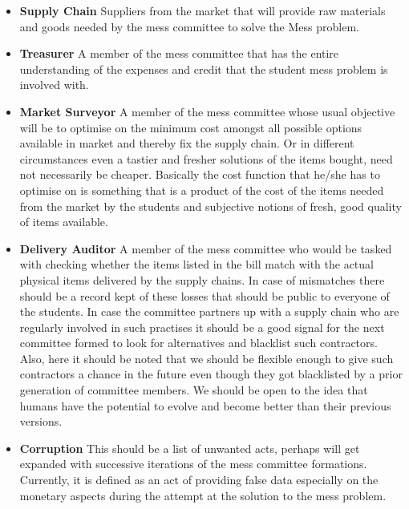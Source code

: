 \documentclass[12pt]{report}
\begin{document}
\begin{itemize}
\item{\textbf{Supply Chain}} Suppliers from the market that will provide raw materials and goods needed by the mess committee to solve the Mess problem. 
\item{\textbf{Treasurer}} A member of the mess committee that has the entire understanding of the expenses and credit that the student mess problem is involved with.
\item{\textbf{Market Surveyor}} A member of the mess committee whose usual objective will be to optimise on the minimum cost amongst all possible options available in market and thereby fix the supply chain.  Or in different circumstances even a tastier and fresher solutions of the items bought, need not necessarily be cheaper. Basically the cost function that he/she has to optimise on is something that is a product of the cost of the items needed from the market by the students and subjective notions of fresh, good quality of items available.
\item{\textbf{Delivery Auditor} } A member of the mess committee who would be tasked with checking whether the items listed in the bill match with the actual physical items delivered by the supply chains. In case of mismatches there should be a record kept of these losses that should be public to everyone of the students. In case the committee partners up with a supply chain who are regularly involved in such practises it should be a good signal for the next committee formed to look for alternatives and blacklist such contractors. Also, here it should be noted that we should be flexible enough to give such contractors a chance in the future even though they got blacklisted by a prior generation of committee members. We should be open to the idea that humans have the potential to evolve and become better than their previous versions. 
\item{\textbf{Corruption}} This should be a list of unwanted acts, perhaps will get expanded with successive iterations of the mess committee formations. Currently, it is defined as an act of providing false data especially on the monetary aspects during the attempt at the solution to the mess problem. 
\end{itemize}
\end{document}

